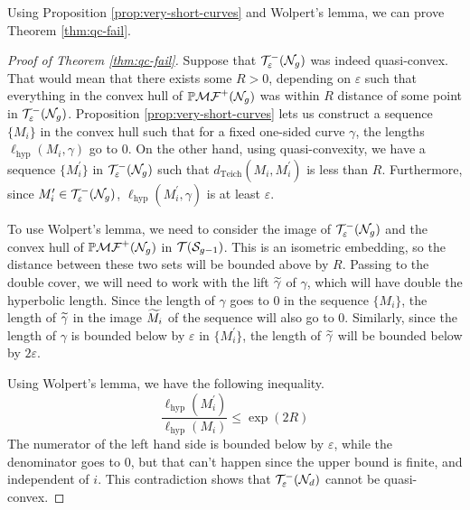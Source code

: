 \documentclass[12pt, reqno]{amsart}
\begin{document}
Using Proposition \ref{prop:very-short-curves} and Wolpert's lemma, we can prove Theorem
\ref{thm:qc-fail}.
\begin{proof}[Proof of Theorem \ref{thm:qc-fail}]
  Suppose that $\mathcal{T}_{\varepsilon}^{-}(\mathcal{N}_g)$ was indeed quasi-convex.
  That would mean that there exists some $R > 0$,
  depending on $\varepsilon$ such that everything in the convex hull of $\mathbb{P}\mathcal{MF}^+(\mathcal{N}_g)$ was within $R$
  distance of some point in $\mathcal{T}_{\varepsilon}^{-}(\mathcal{N}_g)$.  Proposition \ref{prop:very-short-curves} lets us construct a
  sequence $\{M_i\}$ in the convex hull such that for a fixed one-sided curve $\gamma$, the lengths
  $\ell_{\mathrm{hyp}}(M_i, \gamma)$ go to $0$. On the other hand, using quasi-convexity, we have a sequence
  $\{M_{i}^{\prime}\}$ in $\mathcal{T}_{\varepsilon}^{-}(\mathcal{N}_g)$ such that $d_{\mathrm{Teich}}(M_i, M_i^{\prime})$ is less than
  $R$. Furthermore, since $M_i^{\prime} \in \mathcal{T}_{\varepsilon}^{-}(\mathcal{N}_g)$, $\ell_{\mathrm{hyp}}(M_i^{\prime}, \gamma)$ is at
  least $\varepsilon$.

  To use Wolpert's lemma, we need to consider the image of $\mathcal{T}_{\varepsilon}^{-}(\mathcal{N}_g)$ and the convex hull of
  $\mathbb{P}\mathcal{MF}^+(\mathcal{N}_g)$ in $\mathcal{T}(\mathcal{S}_{g-1})$. This is an isometric embedding, so the distance between these two
  sets will be bounded above by $R$. Passing to the double cover, we will need to work with the lift
  $\widetilde{\gamma}$ of $\gamma$, which will have double the hyperbolic length.  Since the length of $\gamma$ goes
  to $0$ in the sequence $\{M_i\}$, the length of $\widetilde{\gamma}$ in the image $\widetilde{M_i}$ of the sequence will
  also go to $0$. Similarly, since the length of $\gamma$ is bounded below by $\varepsilon$ in
  $\{M_{i}^{\prime}\}$, the length of $\widetilde{\gamma}$ will be bounded below by $2 \varepsilon$.

  Using Wolpert's lemma, we have the following inequality.
  \begin{equation}
    \label{eq:20}
    \frac{\ell_{\mathrm{hyp}}(M_i^{\prime})}{\ell_{\mathrm{hyp}}(M_i)} \leq \exp(2R)
  \end{equation}
  The numerator of the left hand side is bounded below by $\varepsilon$, while the denominator goes to $0$, but that
  can't happen since the upper bound is finite, and independent of $i$.
  This contradiction shows that $\mathcal{T}_{\varepsilon}^{-}(\mathcal{N}_d)$ cannot be quasi-convex.
\end{proof}

\printbibliography
\end{document}
